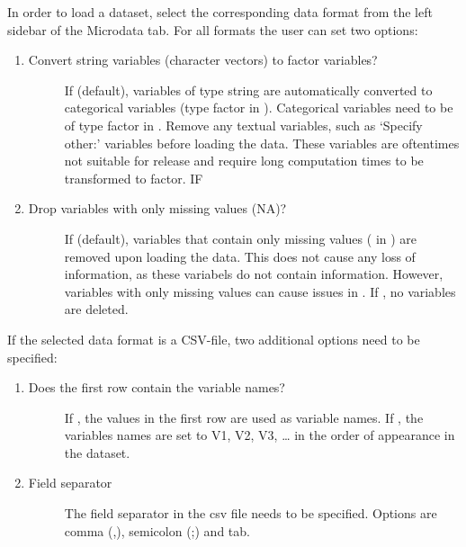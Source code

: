 \documentclass[letterpaper,10pt,english]{sphinxmanual}
\begin{document}
In order to load a dataset, select the corresponding data format
from the left sidebar of the Microdata tab. For all formats the user can set two options:
\begin{enumerate}
\item {} \begin{description}
\item[{Convert string variables (character vectors) to factor variables?}] \leavevmode
If  (default), variables of type string are automatically converted to categorical variables
(type factor in ). Categorical variables need to be of type factor in .
Remove any textual variables, such as ‘Specify other:’ variables before loading the
data. These variables are oftentimes not suitable for release and require long
computation times to be transformed to factor. IF 

\end{description}

\item {} \begin{description}
\item[{Drop variables with only missing values (NA)?}] \leavevmode
If  (default), variables that contain only missing values ( in )
are removed upon loading the data. This does not cause any loss of information,
as these variabels do not contain information. However, variables with only
missing values can cause issues in . If , no variables are deleted.

\end{description}

\end{enumerate}

If the selected data format is a CSV-file, two additional options need to be specified:
\begin{enumerate}
\item {} \begin{description}
\item[{Does the first row contain the variable names?}] \leavevmode
If , the values in the first row are used as variable names. If
, the variables names are set to V1, V2, V3, … in the order of
appearance in the dataset.

\end{description}

\item {} \begin{description}
\item[{Field separator}] \leavevmode
The field separator in the csv file needs to be specified. Options are comma (,),
semicolon (;) and tab.

\end{description}

\end{enumerate}
\end{document}

